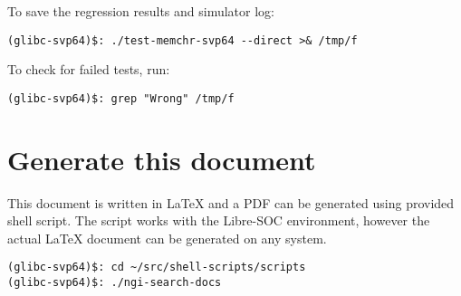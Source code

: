 To save the regression results and simulator log:

\begin{verbatim}
(glibc-svp64)$: ./test-memchr-svp64 --direct >& /tmp/f
\end{verbatim}

To check for failed tests, run:

\begin{verbatim}
(glibc-svp64)$: grep "Wrong" /tmp/f
\end{verbatim}

\section{Generate this document}

This document is written in \LaTeX{} and a PDF can be generated using provided
shell script. The script works with the Libre-SOC environment, however the
actual \LaTeX{} document can be generated on any system.

\begin{verbatim}
(glibc-svp64)$: cd ~/src/shell-scripts/scripts
(glibc-svp64)$: ./ngi-search-docs
\end{verbatim}
